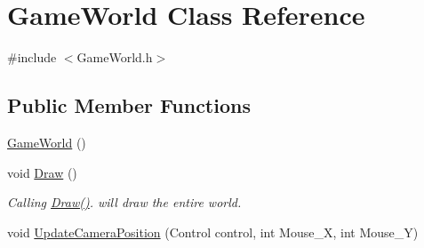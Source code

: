 \hypertarget{class_game_world}{}\section{Game\+World Class Reference}
\label{class_game_world}


{\ttfamily \#include $<$Game\+World.\+h$>$}

\subsection*{Public Member Functions}
\begin{DoxyCompactItemize}
\item 
\hyperlink{class_game_world_a681994123c12833d43c957d6cfb33765}{Game\+World} ()
\item 
void \hyperlink{class_game_world_a275418607d8286979b276f165ad5876b}{Draw} ()
\begin{DoxyCompactList}\small\item\em Calling \hyperlink{class_game_world_a275418607d8286979b276f165ad5876b}{Draw()}. will draw the entire world. \end{DoxyCompactList}\item 
void \hyperlink{class_game_world_a9fa019e8e1d4bbc8e8c101352a73b17a}{Update\+Camera\+Position} (Control control, int Mouse\+\_\+\+X, int Mouse\+\_\+\+Y)
\end{DoxyCompactItemize}
